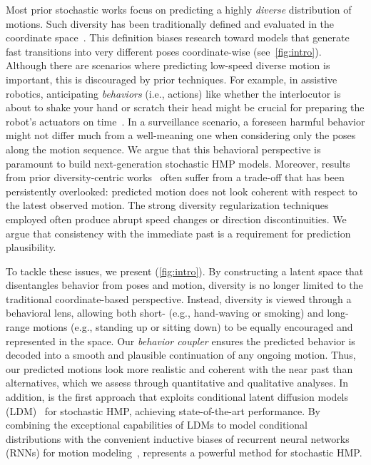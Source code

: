 \documentclass[10pt,twocolumn,letterpaper]{article}
\begin{document}
Most prior stochastic works focus on predicting a highly \textit{diverse} distribution of motions.  Such diversity has been traditionally defined and evaluated in the coordinate space~\cite{yuan2020dlow, dang2022diverse, mao2021gsps, salzmann2022motron, ma2022multiobjective}. This definition biases research toward models that generate fast transitions into very different poses coordinate-wise (see~\autoref{fig:intro}). 
Although there are scenarios where predicting low-speed diverse motion is important, this is discouraged by prior techniques. For example, in assistive robotics, anticipating \textit{behaviors} (i.e., actions) like whether the interlocutor is about to shake your hand or scratch their head might be crucial for preparing the robot's actuators on time~\cite{Barquero2022survey, palmero2022chalearn}. In a surveillance scenario, a foreseen harmful behavior might not differ much from a well-meaning one when considering only the poses along the motion sequence. We argue that this behavioral perspective is paramount to build next-generation stochastic HMP models.
Moreover, results from prior diversity-centric works~\cite{mao2021gsps, dang2022diverse} often suffer from a trade-off that has been persistently overlooked: predicted motion does not look coherent with respect to the latest observed motion. The strong diversity regularization techniques employed often produce abrupt speed changes or direction discontinuities. We argue that consistency with the immediate past is a requirement for prediction plausibility.


To tackle these issues, we present \modelname{} (\autoref{fig:intro}). 
By constructing a latent space that disentangles behavior from poses and motion, diversity is no longer limited to the traditional coordinate-based perspective. Instead, diversity is viewed through a behavioral lens, allowing both short- (e.g., hand-waving or smoking) and long-range motions (e.g., standing up or sitting down) to be equally encouraged and represented in the space.
Our \textit{behavior coupler} ensures the predicted behavior is decoded into a smooth and plausible continuation of any ongoing motion. Thus, our predicted motions look more realistic and coherent with the near past than alternatives, which we assess through quantitative and qualitative analyses. In addition, \modelname{} is the first approach that exploits conditional latent diffusion models (LDM)~\cite{vahdat2021score, rombach2022high} for stochastic HMP, achieving state-of-the-art performance. By combining the exceptional capabilities of LDMs to model conditional distributions with the convenient inductive biases of recurrent neural networks (RNNs) for motion modeling~\cite{lyu20223d}, \modelname{} represents a powerful method for stochastic HMP.
\end{document}
